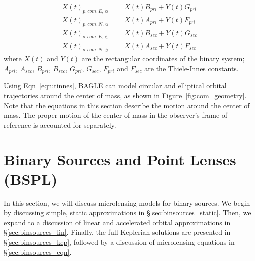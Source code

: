 \documentclass[twocolumn]{aastex701}
\newcommand{\vect}[1]{\boldsymbol{#1}}
\newcommand{\Xcomp}{\vect{X(t)}_{\boldsymbol{p},\boldsymbol{com},\sun}}
\newcommand{\Xcoms}{\vect{X(t)}_{\boldsymbol{s},\boldsymbol{com},\sun}}
\newcommand{\Xcomep}{{X(t)}_{{p, {com}, E},\sun}}
\newcommand{\Xcomnp}{{X(t)}_{{p, {com}, N},\sun}}
\newcommand{\Xcomes}{{X(t)}_{{s, {com}, E},\sun}}
\newcommand{\Xcomns}{{X(t)}_{{s, {com}, N},\sun}}
\newcommand{\Apri}{A_{pri}}
\newcommand{\Asec}{A_{sec}}
\newcommand{\Bpri}{B_{pri}}
\newcommand{\Bsec}{B_{sec}}
\newcommand{\Fpri}{F_{pri}}
\newcommand{\Fsec}{F_{sec}}
\newcommand{\Gpri}{G_{pri}}
\newcommand{\Gsec}{G_{sec}}
\begin{document}
\begin{eqnarray}
\label{eqn:tinnes}
    \Xcomep &= X(t) \Bpri + Y(t) \Gpri  \nonumber \\
    \Xcomnp &= X(t) \Apri + Y(t) \Fpri  \nonumber \\
    \Xcomes &= X(t) \Bsec + Y(t) \Gsec \nonumber \\
    \Xcomns &= X(t) \Asec + Y(t) \Fsec 
\end{eqnarray}
where $X(t)$ and $Y(t)$ are the rectangular coordinates of the binary system; $A_{pri}$, $A_{sec}$, $B_{pri}$, $B_{sec}$, $G_{pri}$, $G_{sec}$, $F_{pri}$ and $F_{sec}$ are the Thiele-Innes constants. 

Using Eqn~\ref{eqn:tinnes}, BAGLE can model circular and elliptical orbital trajectories around the center of mass, as shown in Figure~\ref{fig:com_geometry}. Note that the equations in this section describe the motion around the center of mass. The proper motion of the center of mass in the observer's frame of reference is accounted for separately. 



\section{Binary Sources and Point Lenses (BSPL) \label{sec:binsource}}

In this section, we will discuss microlensing models for binary sources. We begin by discussing simple, static approximations in \S\ref{sec:binsources_static}. Then, we expand to a discussion of linear and accelerated orbital approximations in \S\ref{sec:binsources_lin}. Finally, the full Keplerian solutions are presented in \S\ref{sec:binsources_kep}, followed by a discussion of microlensing equations in \S\ref{sec:binsources_eqn}.
\end{document}
